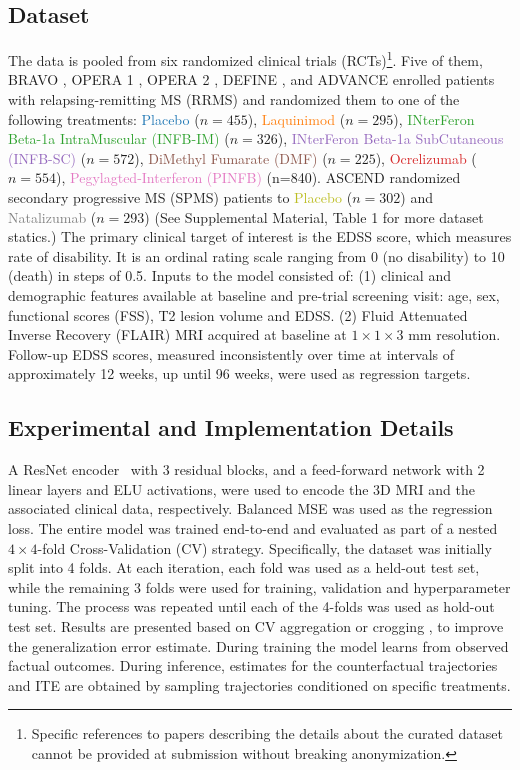\documentclass[runningheads]{llncs}
\newcommand{\blue}{\textcolor[HTML]{1f77b4}}
\newcommand{\orange}{\textcolor[HTML]{ff7f0e}}
\newcommand{\green}{\textcolor[HTML]{2ca02c}}
\newcommand{\red}{\textcolor[HTML]{d62728}}
\newcommand{\purple}{\textcolor[HTML]{9467bd}}
\newcommand{\brown}{\textcolor[HTML]{8c564b}}
\newcommand{\pink}{\textcolor[HTML]{e377c2}}
\newcommand{\gray}{\textcolor[HTML]{7f7f7f}}
\newcommand{\chartreuse}{\textcolor[HTML]{bcbd22}}
\begin{document}
\subsection{Dataset}
The data is pooled from six randomized clinical trials (RCTs)\footnote{Specific references to papers describing the details about the curated dataset cannot be provided at submission without breaking anonymization.}. Five of them,  BRAVO \cite{BRAVO}, OPERA 1 \cite{OPERA}, OPERA 2 \cite{OPERA}, DEFINE \cite{DEFINE}, and ADVANCE \cite{ADVANCE_ATTAIN} enrolled patients with relapsing-remitting MS (RRMS) and randomized them to one of the following treatments: \blue{Placebo} ($n=455$), \orange{Laquinimod} ($n=295$), \green{INterFeron Beta-1a IntraMuscular (INFB-IM)}  ($n=326 $), \purple{INterFeron Beta-1a SubCutaneous (INFB-SC)} ($n=572$), \brown{DiMethyl Fumarate (DMF)}  ($n=225$),  \red{Ocrelizumab} ($n=554$), \pink{Pegylagted-Interferon (PINFB)} (n=840). ASCEND \cite{ASCEND} randomized secondary progressive MS (SPMS) patients to \chartreuse{Placebo} ($n=302$) and \gray{Natalizumab} ($n=293$) (See Supplemental Material, Table 1 for more dataset statics.)  The primary clinical target of interest is the EDSS score, which measures rate of disability. It is an ordinal rating scale ranging from 0 (no disability) to 10 (death) in steps of 0.5. Inputs to the model consisted of: (1) clinical and demographic features available at baseline and pre-trial screening visit: age, sex, functional scores (FSS), T2 lesion volume and EDSS. (2) Fluid Attenuated Inverse Recovery (FLAIR) MRI acquired at baseline at $1 \times 1 \times 3$ mm resolution. Follow-up EDSS scores, measured inconsistently over time at intervals of approximately 12 weeks, up until 96 weeks, were used as regression targets.

\subsection{Experimental and Implementation Details}
A ResNet encoder~\cite{He2016} with 3 residual blocks, and a feed-forward network with 2 linear layers and ELU activations, were used to encode the 3D MRI and the associated clinical data, respectively. Balanced MSE \cite{BalancedMSE} was used as the regression loss. The entire model was trained end-to-end and evaluated as part of a nested $4 \times 4$-fold Cross-Validation (CV) strategy. Specifically, the dataset was initially split into 4 folds. At each iteration, each fold was used as a held-out test set, while the remaining 3 folds were used for training, validation and hyperparameter tuning. The process was repeated until each of the 4-folds was used as hold-out test set. Results are presented based on CV aggregation or crogging \cite{Crogging}, to improve the generalization error estimate. During training the model learns from observed factual outcomes. During inference, estimates for the counterfactual trajectories and ITE are obtained by sampling trajectories conditioned on specific treatments.
\end{document}
